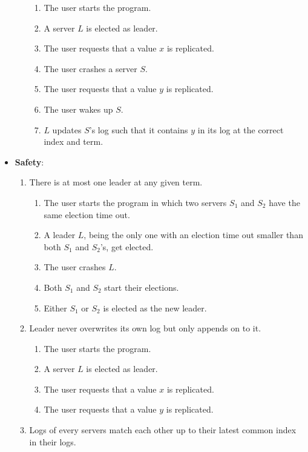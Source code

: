 \begin{itemize}
\begin{enumerate}
\begin{enumerate}
        \item The user starts the program.
        \item A server $L$ is elected as leader.
        \item The user requests that a value $x$ is replicated.
        \item The user crashes a server $S$.
        \item The user requests that a value $y$ is replicated.
        \item The user wakes up $S$.
        \item $L$ updates $S$'s log such that it contains $y$ in its log at the correct index and term.
        \end{enumerate}
    \end{enumerate}
\item \textbf{Safety}:
    \begin{enumerate}
    \item There is at most one leader at any given term.
        \begin{enumerate}
        \item The user starts the program in which two servers $S_1$ and $S_2$ have the same election time out.
        \item A leader $L$, being the only one with an election time out smaller than both $S_1$ and $S_2$'s, get elected.
        \item The user crashes $L$.
        \item Both $S_1$ and $S_2$ start their elections.
        \item Either $S_1$ or $S_2$ is elected as the new leader.
        \end{enumerate}
    \item Leader never overwrites its own log but only appends on to it.
        \begin{enumerate}
        \item The user starts the program.
        \item A server $L$ is elected as leader.
        \item The user requests that a value $x$ is replicated.
        \item The user requests that a value $y$ is replicated.%
        \end{enumerate}
    \item Logs of every servers match each other up to their latest common index in their logs.
        \begin{enumerate}

\end{enumerate}
\end{enumerate}
\end{itemize}
